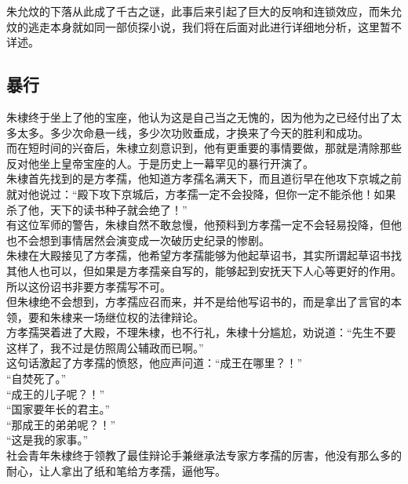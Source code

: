 \begin{multicols}{\theparacolNo}
朱允炆的下落从此成了千古之谜，此事后来引起了巨大的反响和连锁效应，而朱允炆的逃走本身就如同一部侦探小说，我们将在后面对此进行详细地分析，这里暂不详述。\\

\subsection{暴行}
朱棣终于坐上了他的宝座，他认为这是自己当之无愧的，因为他为之已经付出了太多太多。多少次命悬一线，多少次功败垂成，才换来了今天的胜利和成功。\\

而在短时间的兴奋后，朱棣立刻意识到，他有更重要的事情要做，那就是清除那些反对他坐上皇帝宝座的人。于是历史上一幕罕见的暴行开演了。\\

朱棣首先找到的是方孝孺，他知道方孝孺名满天下，而且道衍早在他攻下京城之前就对他说过：“殿下攻下京城后，方孝孺一定不会投降，但你一定不能杀他！如果杀了他，天下的读书种子就会绝了！”\\

有这位军师的警告，朱棣自然不敢怠慢，他预料到方孝孺一定不会轻易投降，但他也不会想到事情居然会演变成一次破历史纪录的惨剧。\\

朱棣在大殿接见了方孝孺，他希望方孝孺能够为他起草诏书，其实所谓起草诏书找其他人也可以，但如果是方孝孺亲自写的，能够起到安抚天下人心等更好的作用。所以这份诏书非要方孝孺写不可。\\

但朱棣绝不会想到，方孝孺应召而来，并不是给他写诏书的，而是拿出了言官的本领，要和朱棣来一场继位权的法律辩论。\\

方孝孺哭着进了大殿，不理朱棣，也不行礼，朱棣十分尴尬，劝说道：“先生不要这样了，我不过是仿照周公辅政而已啊。”\\

这句话激起了方孝孺的愤怒，他应声问道：“成王在哪里？！”\\

“自焚死了。”\\

“成王的儿子呢？！”\\

“国家要年长的君主。”\\

“那成王的弟弟呢？！”\\

“这是我的家事。”\\

社会青年朱棣终于领教了最佳辩论手兼继承法专家方孝孺的厉害，他没有那么多的耐心，让人拿出了纸和笔给方孝孺，逼他写。\\


\end{multicols}
